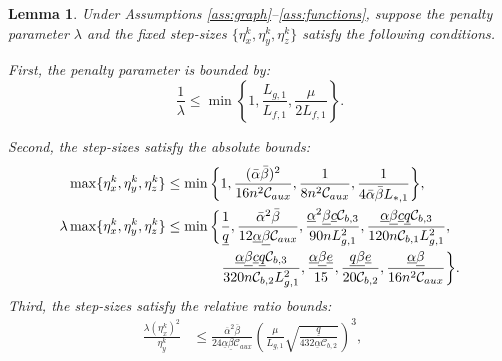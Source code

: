 \documentclass{article}
\theoremstyle{plain}
\newtheorem{lemma}[theorem]{Lemma}
\theoremstyle{definition}
\theoremstyle{remark}
\begin{document}
\begin{lemma}\label{lem:step_size_condition}
    Under Assumptions \ref{ass:graph}--\ref{ass:functions}, suppose the penalty parameter $\lambda$ and the fixed step-sizes $\{\eta_x^k, \eta_y^k, \eta_z^k\}$ satisfy the following conditions. 
    
    First, the penalty parameter is bounded by:
    \begin{equation}\label{step_size_condition_1}
        \frac{1}{\lambda} \leq \min \left\{1, \frac{L_{g,1}}{L_{f,1}}, \frac{\mu}{2L_{f,1}}\right\}.
    \end{equation}
    
    Second, the step-sizes satisfy the absolute bounds:
\begin{subequations}\label{step_size_condition_2}   
\begin{align}
        \max\{\eta_x^k, \eta_y^k, \eta_z^k\} &\leq \min\bigg\{ 1, \frac{(\bar{\alpha}\bar{\beta})^2}{16n^2\mathcal{C}_{aux}}, \frac{1}{8n^2\mathcal{C}_{aux}}, \frac{1}{4\bar{\alpha}\bar{\beta}L_{*,1}} \bigg\}, \\
        \lambda \max\{\eta_x^k, \eta_y^k, \eta_z^k\} &\leq \min\bigg\{ \frac{1}{\underline{q}}, 
        \frac{\bar{\alpha}^2 \bar{\beta}}{12 \underline{\alpha} \underline{\beta} \mathcal{C}_{aux}},
        \frac{\underline{\alpha}^2 \underline{\beta} \underline{c} \mathcal{C}_{b,3}}{90 n L_{g,1}^2}, 
        \frac{\underline{\alpha} \underline{\beta} \underline{c} \underline{q} \mathcal{C}_{b,3}}{120 n\mathcal{C}_{b,1} L_{g,1}^2}, \notag \\
        &\qquad\qquad \frac{\underline{\alpha} \underline{\beta} \underline{c} \underline{q} \mathcal{C}_{b,3}}{320 n \mathcal{C}_{b,2} L_{g,1}^2}, 
        \frac{\underline{\alpha} \underline{\beta} \underline{e}}{15}, 
        \frac{\underline{q} \underline{\beta} \underline{e}}{20 \mathcal{C}_{b,2}}, 
        \frac{\underline{\alpha} \underline{\beta}}{16 n^2 \mathcal{C}_{aux}} \bigg\}.
    \end{align}       
\end{subequations} 
    Third, the step-sizes satisfy the relative ratio bounds:
    \begin{subequations}\label{step_size_condition_3}
    \begin{align}
        \frac{\lambda(\eta_{x}^{k})^{2}}{\eta_{y}^{k}} &\leq \frac{\overline{\alpha}^{2} \overline{\beta}}{24 \underline{\alpha} \underline{\beta} \mathcal{C}_{aux}} \left( \frac{\mu}{L_{g,1}} \sqrt{ \frac{\underline{q}}{432 \underline{\alpha} \mathcal{C}_{b,2}} } \right)^3, \quad 

\end{align}
\end{subequations}
\end{lemma}
\end{document}
